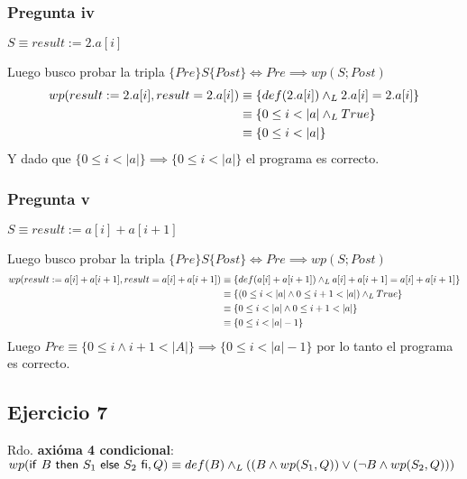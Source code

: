 \subsubsection{Pregunta iv}
$ S \equiv result := 2.a[i] $

Luego busco probar la tripla $ \{ Pre \}S\{ Post \} \iff Pre \implies wp(S; Post) $
\begin{align*}
    wp(result := 2.a[i], result = 2.a[i]) &\equiv \{ def(2.a[i]) \land _L 2.a[i] = 2.a[i] \} \\
    &\equiv \{ 0 \leq i < |a| \land _L True \} \\
    &\equiv \{ 0 \leq i < |a| \} \\
\end{align*}
Y dado que $ \{ 0 \leq i < |a| \} \implies \{ 0 \leq i < |a| \} $ el programa es correcto.

\subsubsection{Pregunta v}
$ S \equiv result := a[i] + a[i+1] $

Luego busco probar la tripla $ \{ Pre \}S\{ Post \} \iff Pre \implies wp(S; Post) $
\begin{align*}
    wp(result := a[i] + a[i+1],result = a[i] + a[i+1]) &\equiv \{ def(a[i] + a[i+1]) \land _L a[i] + a[i+1] = a[i] + a[i+1] \} \\
    &\equiv \{ (0 \leq i < |a| \wedge 0 \leq i+1 < |a|) \land _L True \} \\
    &\equiv \{ 0 \leq i < |a| \wedge 0 \leq i+1 < |a| \} \\
    &\equiv \{ 0 \leq i < |a|-1 \} \\
\end{align*}
Luego $ Pre \equiv \{ 0 \leq i \wedge i+1 < |A| \} \implies \{ 0 \leq i < |a|-1 \} $ por lo tanto el programa es correcto.

\subsection{Ejercicio 7}

Rdo. \textbf{axióma 4 condicional}: $ wp(\mathsf{if}\ B\ \mathsf{then}\ S_1\ \mathsf{else}\ S_2\ \mathsf{fi}, Q) \equiv def(B) \land _L ((B \wedge wp(S_1, Q)) \vee (\neg B \wedge wp(S_2, Q))) $

